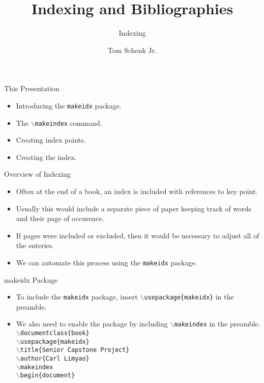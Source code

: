 \documentclass[pdf]{prosper}
\title{Indexing and Bibliographies}
\subtitle{Indexing}
\author{Tom Schenk Jr.}
\begin{document}
\maketitle
\begin{slide}{This Presentation}
	\begin{itemize}
		\item Introducing the \texttt{makeidx} package.
		\item The \texttt{$\backslash$makeindex} command.
		\item Creating index points.
		\item Creating the index.
	\end{itemize}
\end{slide}
\begin{slide}{Overview of Indexing}
	\begin{itemize}
		\item Often at the end of a book, an index is included with references to key point.
		\item Usually this would include a separate piece of paper keeping track of words and their page of occurence.
		\item If pages were included or excluded, then it would be necessary to adjust all of the enteries.
		\item We can automate this process using the \texttt{makeidx} package.
	\end{itemize}
\end{slide}
\begin{slide}{makeidx Package}
	\begin{itemize}
		\item To include the \texttt{makeidx} package, insert \texttt{$\backslash$usepackage\{makeidx\}} in the preamble.
		\item We also need to enable the package by including \texttt{$\backslash$makeindex} in the preamble. \\
\texttt{$\backslash$documentclass\{book\}} \\
\texttt{$\backslash$usepackage\{makeidx\}} \\
\texttt{$\backslash$title\{Senior Capstone Project\}} \\
\texttt{$\backslash$author\{Carl Limyao\}} \\
\texttt{$\backslash$makeindex} \\
\texttt{$\backslash$begin\{document\}} \\
	\end{itemize}
\end{slide}
\end{document}
